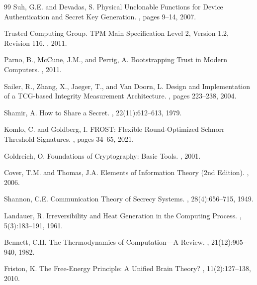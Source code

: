 \documentclass[11pt,a4paper]{article}
\begin{document}
\begin{thebibliography}{99}
Suh, G.E. and Devadas, S.
\newblock Physical Unclonable Functions for Device Authentication and Secret Key Generation.
, pages 9--14, 2007.

Trusted Computing Group.
\newblock TPM Main Specification Level 2, Version 1.2, Revision 116.
, 2011.

Parno, B., McCune, J.M., and Perrig, A.
\newblock Bootstrapping Trust in Modern Computers.
, 2011.

Sailer, R., Zhang, X., Jaeger, T., and Van Doorn, L.
\newblock Design and Implementation of a TCG-based Integrity Measurement Architecture.
, pages 223--238, 2004.

Shamir, A.
\newblock How to Share a Secret.
, 22(11):612--613, 1979.

Komlo, C. and Goldberg, I.
\newblock FROST: Flexible Round-Optimized Schnorr Threshold Signatures.
, pages 34--65, 2021.

Goldreich, O.
\newblock Foundations of Cryptography: Basic Tools.
, 2001.

Cover, T.M. and Thomas, J.A.
\newblock Elements of Information Theory (2nd Edition).
, 2006.

Shannon, C.E.
\newblock Communication Theory of Secrecy Systems.
, 28(4):656--715, 1949.

Landauer, R.
\newblock Irreversibility and Heat Generation in the Computing Process.
, 5(3):183--191, 1961.

Bennett, C.H.
\newblock The Thermodynamics of Computation---A Review.
, 21(12):905--940, 1982.

Friston, K.
\newblock The Free-Energy Principle: A Unified Brain Theory?
, 11(2):127--138, 2010.


\end{thebibliography}
\end{document}
